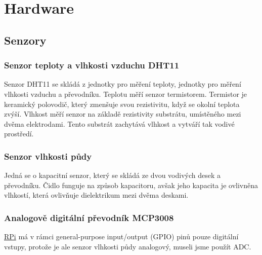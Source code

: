 \documentclass[czech,12pt,a4paper]{article}
\begin{document}
\clearpage

\section{Hardware} \label{secHardware}

\subsection{Senzory}

\subsubsection{Senzor teploty a vlhkosti vzduchu DHT11}

Senzor \ac{DHT11} se skládá z jednotky pro měření teploty, jednotky pro měření vlhkosti vzduchu a převodníku. Teplotu měří senzor termistorem. Termistor je keramický polovodič, který zmenšuje svou rezistivitu, když se okolní teplota zvýší. Vlhkost měří senzor na základě rezistivity substrátu, umístěného mezi dvěma elektrodami. Tento substrát zachytává vlhkost a vytváří tak vodivé prostředí.

\subsubsection{Senzor vlhkosti půdy}

Jedná se o kapacitní senzor, který se skládá ze dvou vodivých desek a převodníku. Čidlo funguje na způsob kapacitoru, avšak jeho kapacita je ovlivněna vlhkostí, která ovlivňuje dielektrikum mezi dvěma deskami.

\subsubsection{Analogově digitální převodník MCP3008} \label{secADC}

\underline{\ac{RPi}} má v rámci general-purpose input/output (GPIO) pinů pouze digitální vstupy, protože je ale senzor vlhkosti půdy analogový, museli jsme použít \ac{ADC}.
\end{document}
